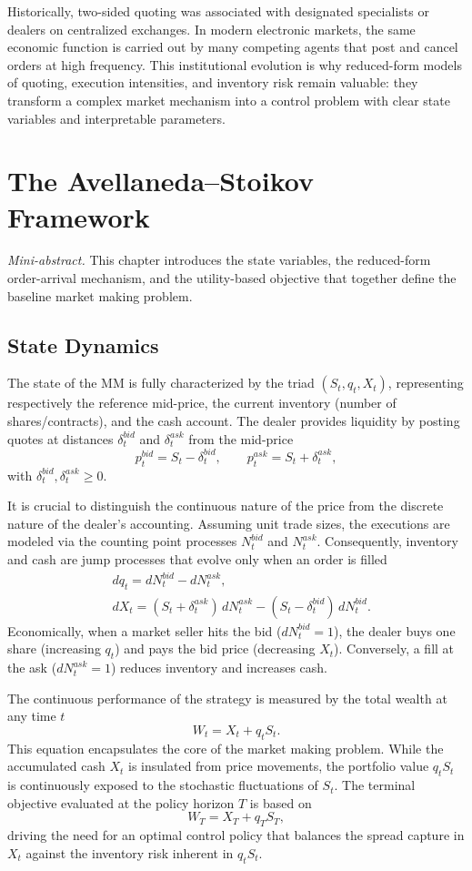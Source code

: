 \documentclass[a4paper,10pt,titlepage,oneside,openany]{book}
\theoremstyle{plain}\newtheorem{theorem}{Theorem}[chapter]
\theoremstyle{definition}\newtheorem{definition}{Definition}[chapter]
\theoremstyle{remark}\newtheorem{remark}{Remark}[chapter]
\newcommand{\miniabstract}[1]{%
\vspace{-2pt}
\begin{tcolorbox}[colback=gray!6,colframe=black!15,boxrule=0.3pt,arc=3pt,left=6pt,right=6pt,top=4pt,bottom=4pt]
\textit{Mini-abstract.} #1
\end{tcolorbox}
\vspace{-4pt}
}
\begin{document}
Historically, two-sided quoting was associated with designated specialists or dealers on centralized exchanges. In modern electronic markets, the same economic function is carried out by many competing agents that post and cancel orders at high frequency. This institutional evolution is why reduced-form models of quoting, execution intensities, and inventory risk remain valuable: they transform a complex market mechanism into a control problem with clear state variables and interpretable parameters.

\chapter{The Avellaneda--Stoikov Framework}
\miniabstract{This chapter introduces the state variables, the reduced-form order-arrival mechanism, and the utility-based objective that together define the baseline market making problem.}

\section{State Dynamics}
The state of the MM is fully characterized by the triad $(S_t, q_t, X_t)$, representing respectively the reference mid-price, the current inventory (number of shares/contracts), and the cash account. The dealer provides liquidity by posting quotes at distances $\delta_t^{bid}$ and $\delta_t^{ask}$ from the mid-price
\[
p_t^{bid}=S_t-\delta_t^{bid}, \qquad p_t^{ask}=S_t+\delta_t^{ask},
\]
with $\delta_t^{bid},\delta_t^{ask}\ge 0$.

It is crucial to distinguish the continuous nature of the price from the discrete nature of the dealer's accounting. Assuming unit trade sizes, the executions are modeled via the counting point processes $N_t^{bid}$ and $N_t^{ask}$. Consequently, inventory and cash are jump processes that evolve only when an order is filled
\begin{align*}
    &dq_t=dN_t^{bid}-dN_t^{ask},\\
    &dX_t=(S_t+\delta_t^{ask})\,dN_t^{ask}-(S_t-\delta_t^{bid})\,dN_t^{bid}.
\end{align*}
Economically, when a market seller hits the bid ($dN_t^{bid}=1$), the dealer buys one share (increasing $q_t$) and pays the bid price (decreasing $X_t$). Conversely, a fill at the ask ($dN_t^{ask}=1$) reduces inventory and increases cash.

The continuous performance of the strategy is measured by the total wealth at any time $t$
\[
W_t=X_t+q_tS_t.
\]
This equation encapsulates the core of the market making problem. While the accumulated cash $X_t$ is insulated from price movements, the portfolio value $q_tS_t$ is continuously exposed to the stochastic fluctuations of $S_t$. The terminal objective evaluated at the policy horizon $T$ is based on 
\[
W_T=X_T+q_TS_T,
\]
driving the need for an optimal control policy that balances the spread capture in $X_t$ against the inventory risk inherent in $q_tS_t$.
\end{document}
